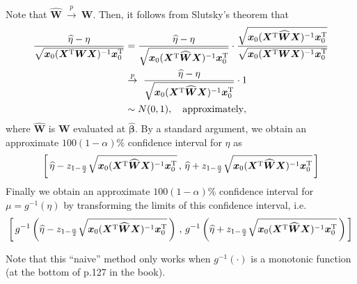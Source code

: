 \documentclass[a4paper]{article}
\begin{document}
Note that $\widehat{\bm{W}} ~\overset{p}{\to}~ \bm{W}$. Then, it follows from Slutsky's theorem that
\begin{align*}
\frac{\widehat{\eta}-\eta}{\sqrt{\bm{x}_{0}(\bm{X}^{\rm T}\bm{W}\bm{X})^{-1}\bm{x}_{0}^{\rm T}}} &= 
\frac{\widehat{\eta}-\eta}{\sqrt{\bm{x}_{0}(\bm{X}^{\rm T}\widehat{\bm{W}}\bm{X})^{-1}\bm{x}_{0}^{\rm T}}}\cdot\frac{\sqrt{\bm{x}_{0}(\bm{X}^{\rm T}\widehat{\bm{W}}\bm{X})^{-1}\bm{x}_{0}^{\rm T}}}{\sqrt{\bm{x}_{0}(\bm{X}^{\rm T}\bm{W}\bm{X})^{-1}\bm{x}_{0}^{\rm T}}}\\
&\overset{p}{\to}~ \frac{\widehat{\eta}-\eta}{\sqrt{\bm{x}_{0}(\bm{X}^{\rm T}\widehat{\bm{W}}\bm{X})^{-1}\bm{x}_{0}^{\rm T}}} \cdot 1\\
&\sim N(0,1), \quad \mbox{approximately},
\end{align*}
where $\widehat{\bm{W}}$ is $\bm{W}$ evaluated at $\widehat{\bm{\beta}}$. By a standard argument, we obtain an approximate $100(1-\alpha){\%}$ confidence interval for $\eta$ as
\begin{align*}
\left[\, \widehat{\eta} -z_{1-\frac{\alpha}{2}}\sqrt{\bm{x}_{0}(\bm{X}^{\rm T}\widehat{\bm{W}}\bm{X})^{-1}\bm{x}_{0}^{\rm T}}\, , \, \widehat{\eta} +z_{1-\frac{\alpha}{2}}\sqrt{\bm{x}_{0}(\bm{X}^{\rm T}\widehat{\bm{W}}\bm{X})^{-1}\bm{x}_{0}^{\rm T}} \, \right]
\end{align*}
Finally we obtain an approximate $100(1-\alpha){\%}$ confidence interval for $\mu=g^{-1}(\eta)$ by transforming the limits of this confidence interval, i.e.
\begin{align*}
\left[\, g^{-1}\left(\widehat{\eta} -z_{1-\frac{\alpha}{2}}\sqrt{\bm{x}_{0}(\bm{X}^{\rm T}\widehat{\bm{W}}\bm{X})^{-1}\bm{x}_{0}^{\rm T}}\,\right)\, , \, g^{-1}\left(\widehat{\eta} +z_{1-\frac{\alpha}{2}}\sqrt{\bm{x}_{0}(\bm{X}^{\rm T}\widehat{\bm{W}}\bm{X})^{-1}\bm{x}_{0}^{\rm T}}\,\right) \,  \right]
\end{align*}

Note that this ``naive'' method only works when $g^{-1}(\cdot)$ is a monotonic function (at the bottom of p.127 in the book).
\end{document}
